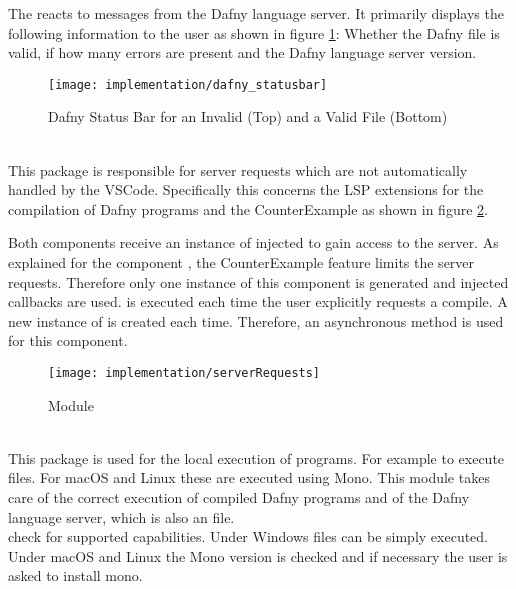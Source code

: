 The  reacts to messages from the Dafny language server.
It primarily displays the following information to the user as shown in figure \ref{fig:statusbar}:
Whether the Dafny file is valid, if how many errors are present and the Dafny language server version.

\begin{figure}[H]
    \centering
    \texttt{[image: implementation/dafny\_statusbar]}
    \caption{Dafny Status Bar for an Invalid (Top) and a Valid File (Bottom)}
    \label{fig:statusbar}
\end{figure}

\textbf{}\\
This package is responsible for server requests which are not automatically handled by the VSCode.
Specifically this concerns the LSP extensions for the compilation of Dafny programs and the CounterExample
as shown in figure \ref{fig:serverRequests}.

Both components receive an instance of  injected to gain access to the server.
As explained for the component ,
the CounterExample feature limits the server requests.
Therefore only one instance of this component is generated and injected callbacks are used.
 is executed each time the user explicitly requests a compile.
A new instance of  is created each time.
Therefore, an asynchronous method is used for this component.

\begin{figure}[H]
    \centering
    \texttt{[image: implementation/serverRequests]}
    \caption{Module }
    \label{fig:serverRequests}
\end{figure}

\textbf{}\\
This package is used for the local execution of programs.
For example to execute  files.
For macOS and Linux these are executed using Mono.
This module takes care of the correct execution of compiled Dafny programs
and of the Dafny language server, which is also an  file.\\

 check for supported capabilities.
Under Windows  files can be simply executed.
Under macOS and Linux the Mono version is checked and if necessary the user is asked to install mono. \\

